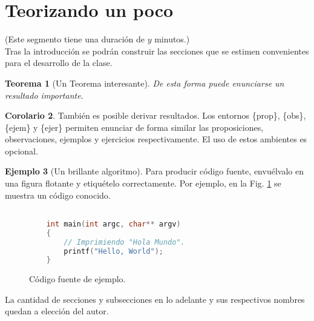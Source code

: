 \documentclass[a4paper,10pt,twocolumn]{article}
\theoremstyle{theorem}
\newtheorem{thm}{Teorema}[section]
\theoremstyle{definition}
\newtheorem{cor}[thm]{Corolario}
\newtheorem{ejem}[thm]{Ejemplo}
\theoremstyle{remark}
\begin{document}
\section{Teorizando un poco}\label{sec:teoria}
(Este segmento tiene una duración de $y$ minutos.)\\

Tras la introducción se podrán construir las secciones que se estimen convenientes para el desarrollo de la clase.

\begin{thm}[Un Teorema interesante]
	De esta forma puede enunciarse un resultado importante.
\end{thm}  

\begin{cor}
	También es posible derivar resultados. Los entornos \{prop\}, \{obs\}, \{ejem\} y \{ejer\} permiten enunciar de forma similar las proposiciones, observaciones, ejemplos y ejercicios respectivamente. El uso de estos ambientes es opcional.
\end{cor}

\begin{ejem}[Un brillante algoritmo] 
Para producir código fuente, envuélvalo en una figura flotante y etiquételo correctamente. Por ejemplo, en la Fig. \ref{fig:code} se muestra un código conocido.


	\begin{figure}[htb]%
	\begin{lstlisting}[language=c]%

    int main(int argc, char** argv)
    {
        // Imprimiendo "Hola Mundo".
        printf("Hello, World");
    }

	\end{lstlisting}
	\caption{Código fuente de ejemplo.\label{fig:code}}
	\end{figure}
\end{ejem}

La cantidad de secciones y subsecciones en lo adelante y sus respectivos nombres quedan a elección del autor.

\end{document}
